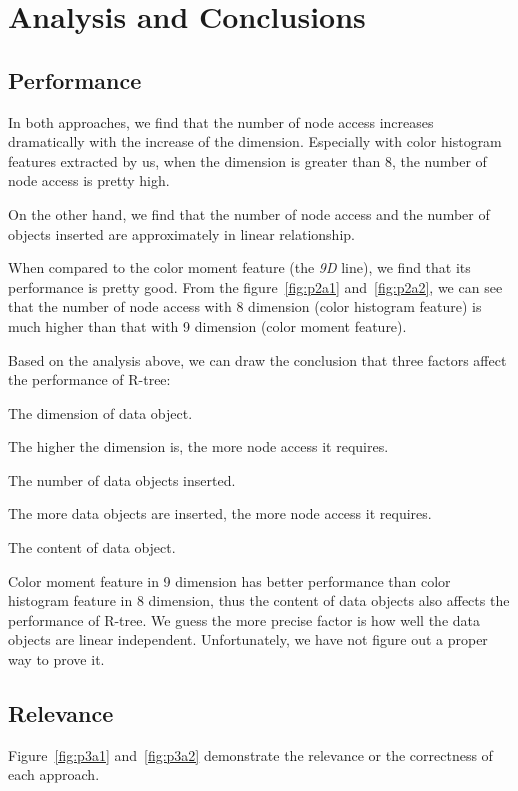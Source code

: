 \documentclass{acm_proc_article-sp}
\begin{document}
\section{Analysis and Conclusions}
\subsection{Performance}
In both approaches, we find that the number of node access increases dramatically with the increase of the dimension. Especially with color histogram features extracted by us, when the dimension is greater than 8, the number of node access is pretty high. 

On the other hand, we find that the number of node access and the number of objects inserted are approximately in linear relationship.

When compared to the color moment feature (the \textit{9D} line), we find that its performance is pretty good. From the figure~\ref{fig:p2a1} and~\ref{fig:p2a2}, we can see that the number of node access with 8 dimension (color histogram feature) is much higher than that with 9 dimension (color moment feature).

Based on the analysis above, we can draw the conclusion that three factors affect the performance of R-tree:

\begin{itemize*}
  \item The dimension of data object.

  The higher the dimension is, the more node access it requires.

  \item The number of data objects inserted.

  The more data objects are inserted, the more node access it requires.

  \item The content of data object.

  Color moment feature in 9 dimension has better performance than color histogram feature in 8 dimension, thus the content of data objects also affects the performance of R-tree. We guess the more precise factor is how well the data objects are linear independent. Unfortunately, we have not figure out a proper way to prove it.
\end{itemize*}

\subsection{Relevance}
Figure~\ref{fig:p3a1} and~\ref{fig:p3a2} demonstrate the relevance or the correctness of each approach.
\end{document}

